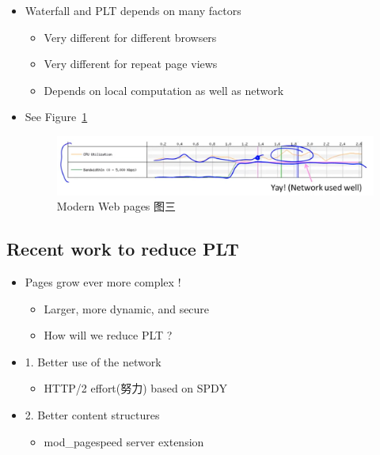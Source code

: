 \documentclass[12pt]{ctexart}   %
\begin{document}
\begin{itemize}
		 \item Waterfall and PLT depends on many factors
		 \begin{itemize}
		 	\item Very different for different browsers
		 	\item Very different for repeat page views
		 	\item Depends on local computation as well as network
		 \end{itemize}
		 \item See Figure~\ref{fig:8-8-3}
		  
		 \begin{figure}[h!] %
		\centering
		 \includegraphics[scale=0.7]{images/8-8-3}
		\caption{ Modern Web pages 图三}
		 \label{fig:8-8-3}
		 \end{figure}
	\end{itemize}
	
	\subsection{Recent work to reduce PLT}
	\begin{itemize}
		\item Pages grow ever more complex !
		\begin{itemize}
			\item Larger, more dynamic, and secure
			\item How will we reduce PLT ?
		\end{itemize}
		
		\item {\color{blue} 1.} Better use of the network
		\begin{itemize}
			\item HTTP/2 effort(努力) based on SPDY
		\end{itemize}
		
		\item {\color{blue} 2.} Better content structures
		\begin{itemize}
			\item mod\_pagespeed server extension
		\end{itemize}
	\end{itemize}
	
\end{document}
